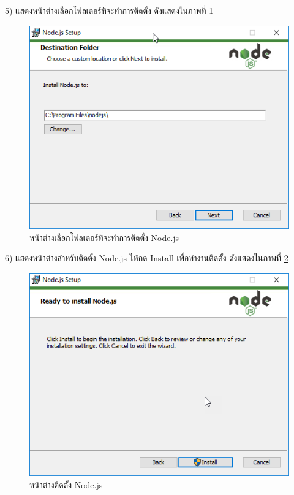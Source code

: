     5) แสดงหน้าต่างเลือกโฟลเดอร์ที่จะทำการติดตั้ง ดังแสดงในภาพที่ \ref{Fig:nodeInstall5}
      \begin{figure}[H]
          \includegraphics[width=\columnwidth]{Figures/7/5}
          \caption{หน้าต่างเลือกโฟลเดอร์ที่จะทำการติดตั้ง Node.js}
          \label{Fig:nodeInstall5}
      \end{figure}

    6) แสดงหน้าต่างสำหรับติดตั้ง Node.js ให้กด Install เพื่อทำงานติดตั้ง ดังแสดงในภาพที่ \ref{Fig:nodeInstall6}
        \begin{figure}[H]
            \includegraphics[width=\columnwidth]{Figures/7/6}
            \caption{หน้าต่างติดตั้ง Node.js}
            \label{Fig:nodeInstall6}
        \end{figure}

